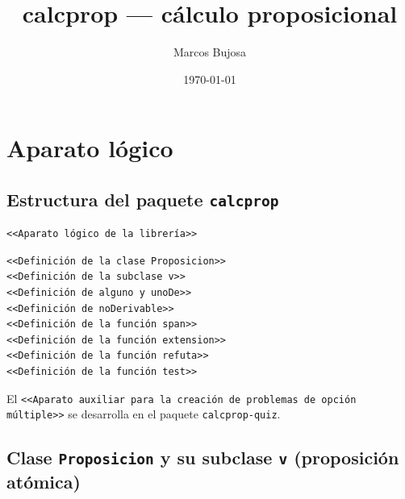 \documentclass[10pt,a4paper]{report}
\author{Marcos Bujosa}
\date{\today}
\title{calcprop — cálculo proposicional}
\begin{document}
\tableofcontents

\part{Aparato lógico}
\label{sec:org93fd436}

\chapter{Estructura del paquete \texttt{calcprop}}
\label{sec:org92b2248}

\begin{verbatim}
<<Aparato lógico de la librería>>
\end{verbatim}

\begin{verbatim}
<<Definición de la clase Proposicion>>
<<Definición de la subclase v>>
<<Definición de alguno y unoDe>>
<<Definición de noDerivable>>
<<Definición de la función span>>
<<Definición de la función extension>>
<<Definición de la función refuta>>
<<Definición de la función test>>
\end{verbatim}

El \texttt{<{}<{}Aparato auxiliar para la creación de problemas de opción múltiple>{}>{}}
se desarrolla en el paquete \texttt{calcprop-quiz}.
\chapter{Clase \texttt{Proposicion} y su subclase \texttt{v} (proposición atómica)}
\label{sec:orga6c06dc}
\end{document}
